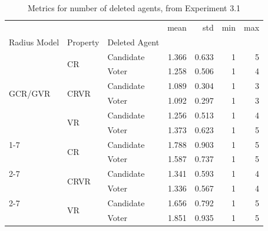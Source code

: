 \begin{table}[b!]
\centering
    \begin{tabular}{lllrrrr}
        \toprule
                &    &       &  mean &   std &   min &   max \\
        Radius Model & Property & Deleted Agent &       &       &       &       \\
        \midrule
        \multirow{6}{*}{GCR/GVR} & \multirow{2}{*}{CR} & Candidate & 1.366 & 0.633 & 1 & 5 \\
                &    & Voter & 1.258 & 0.506 & 1 & 4 \\
        \cline{2-7}
                & \multirow{2}{*}{CRVR} & Candidate & 1.089 & 0.304 & 1 & 3 \\
                &    & Voter & 1.092 & 0.297 & 1 & 3 \\
        \cline{2-7}
                & \multirow{2}{*}{VR} & Candidate & 1.256 & 0.513 & 1 & 4 \\
                &    & Voter & 1.373 & 0.623 & 1 & 5 \\
        \cline{1-7}
        \cline{2-7}
        \multirow{6}{*}{LUCR/LUVR} & \multirow{2}{*}{CR} & Candidate & 1.788 & 0.903 & 1 & 5 \\
                &    & Voter & 1.587 & 0.737 & 1 & 5 \\
        \cline{2-7}
                & \multirow{2}{*}{CRVR} & Candidate & 1.341 & 0.593 & 1 & 4 \\
                &    & Voter & 1.336 & 0.567 & 1 & 4 \\
        \cline{2-7}
                & \multirow{2}{*}{VR} & Candidate & 1.656 & 0.792 & 1 & 5 \\
                &    & Voter & 1.851 & 0.935 & 1 & 5 \\
        \bottomrule
    \end{tabular}
\caption{Metrics for number of deleted agents, from Experiment 3.1}
\label{tab:ex31}
\end{table}
